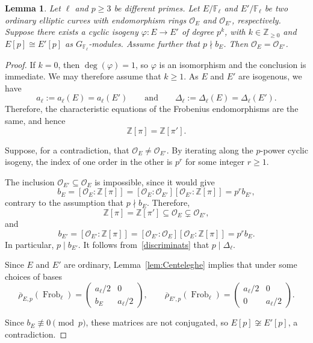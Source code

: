\documentclass[12pt]{amsart}
\numberwithin{equation}{section}
\newtheorem{lemma}[equation]{Lemma}
\theoremstyle{definition}
\newcommand{\F}{\mathbb{F}}
\newcommand{\Z}{\mathbb{Z}}
\newcommand{\rhobar}{{\overline{\rho}}}
\newcommand{\calO}{\mathcal{O}}
\DeclareMathOperator{\Frob}{Frob}
\newcommand{\cO}{\mathcal{O}}
\begin{document}
\begin{lemma}\label{lem:eqEndnew}
     Let $\ell$ and $p \geq 3$ be different primes. Let $E/\F_\ell$ and $E'/\F_\ell$ be two ordinary elliptic curves
     with endomorphism rings $\cO_E$ and
     $\calO_{E'}$, respectively.
     Suppose there exists a cyclic isogeny $\varphi : E \to E'$ of degree $p^k$, with $k\in\Z_{\geq 0}$ and $E[p] \cong E'[p]$ as $G_{\F_\ell}$-modules.
    Assume further that $p \nmid b_E$. Then $\cO_E=\cO_{E'}$.
\end{lemma}
\begin{proof}
If $k=0$, then $\deg(\varphi)=1$, so $\varphi$ is an isomorphism and the
conclusion is immediate. We may therefore assume that $k\geq 1$.
As $E$ and $E'$ are isogenous, we have
\[
    a_\ell:=a_\ell(E)=a_\ell(E')
    \qquad\text{and}\qquad
    \Delta_\ell:=\Delta_\ell(E)=\Delta_\ell(E').
\]
 Therefore, the
characteristic equations of the Frobenius endomorphisms are the same, and
hence
\[
    \Z[\pi]=\Z[\pi'].
\]

Suppose, for a contradiction, that $\cO_E\neq\cO_{E'}$. By iterating
\cite[Proposition~21]{Kohel} along the $p$-power cyclic isogeny, the index of one order in the other is $p^r$ for some integer
$r\geq 1$. 

The inclusion $\cO_{E'}\subseteq\cO_E$ is impossible, since it would give
\[
    b_E=[\cO_E:\Z[\pi]]
        =[\cO_E:\cO_{E'}][\cO_{E'}:\Z[\pi]]
        =p^r b_{E'},
\]
contrary to the assumption that $p\nmid b_E$. Therefore,
\[
    \Z[\pi]=\Z[\pi']
    \subseteq \cO_E
    \subsetneq \cO_{E'},
\]
and
\[
    b_{E'}=[\cO_{E'}:\Z[\pi]]
           =[\cO_{E'}:\cO_E][\cO_E:\Z[\pi]]
           =p^r b_E.
\]
In particular, $p\mid b_{E'}$. It follows from~\eqref{discriminats} that
$p\mid\Delta_\ell$.

  Since $E$ and $E'$ are ordinary, Lemma~\ref{lem:Centeleghe} implies that under some choices of bases 
   \begin{equation}\label{E:FrobE}
    \rhobar_{E,p}(\Frob_\ell)=\left(\begin{smallmatrix}
				 a_\ell/2 & 0 \\
				b_E & a_\ell/2\end{smallmatrix}\right),\qquad
                \rhobar_{E',p}(\Frob_\ell)=\left(\begin{smallmatrix}
				 a_\ell/2 & 0 \\
				0 & a_\ell/2\end{smallmatrix} \right) . 
\end{equation}

   Since $b_E \not\equiv 0 \pmod p$, these matrices are not  conjugated, so $E[p] \not\cong E'[p]$, a contradiction.
\end{proof}
\end{document}

